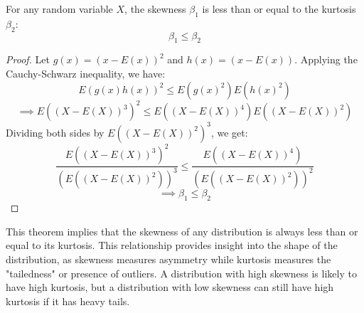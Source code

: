 \documentclass[openany]{book}
\begin{document}
\begin{mytheorem}
    For any random variable $X$, the skewness $\beta_1$ is less than or equal to the kurtosis $\beta_2$:
    $$\beta_1 \leq \beta_2$$
\end{mytheorem}
\begin{proof}
    Let $g(x) = (x - E(x))^2$ and $h(x) = (x - E(x))$. Applying the Cauchy-Schwarz inequality, we have:
    $$E(g(x)h(x))^2 \leq E(g(x)^2)E(h(x)^2)$$
    $$\implies E((X - E(X))^3)^2 \leq E((X - E(X))^4)E((X - E(X))^2)$$
    Dividing both sides by $E((X - E(X))^2)^3$, we get:
    $$\frac{E((X - E(X))^3)^2}{(E((X - E(X))^2))^3} \leq \frac{E((X - E(X))^4)}{(E((X - E(X))^2))^2}$$
    $$\implies \beta_1 \leq \beta_2$$
\end{proof}
\begin{mynote}
    This theorem implies that the skewness of any distribution is always less than or equal to its kurtosis. This relationship provides insight into the shape of the distribution, as skewness measures asymmetry while kurtosis measures the "tailedness" or presence of outliers. A distribution with high skewness is likely to have high kurtosis, but a distribution with low skewness can still have high kurtosis if it has heavy tails.
\end{mynote} 

\end{document}
